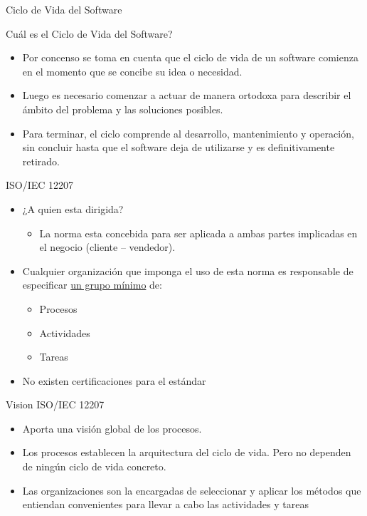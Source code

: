 \documentclass{beamer}
\begin{document}
				\begin{frame}{Ciclo de Vida del Software}
				\begin{center}
					\begin{center}
						{\huge Cu\'al es el Ciclo de Vida del Software?}
					\end{center}
					
					\begin{itemize}
					\pause
						\item Por concenso se toma en cuenta que el ciclo de vida de un software comienza en el momento que se concibe su idea o necesidad.\pause
						\item Luego es necesario comenzar a actuar de manera ortodoxa para describir el ámbito del problema y las soluciones posibles.\pause
						\item Para terminar, el ciclo comprende al desarrollo, mantenimiento y operación, sin concluir hasta que el software deja de utilizarse y es definitivamente retirado.
					\end{itemize}
				\end{center}
			\end{frame}
			
			
			\begin{frame}{ISO/IEC 12207}
				\begin{itemize}
					\item ¿A quien esta dirigida?\pause
					\begin{itemize}
						\item La norma esta concebida para ser aplicada a ambas partes implicadas en el negocio (cliente – vendedor).
					\end{itemize}
					
					\item Cualquier organización que imponga el uso de esta norma es responsable de especificar \underline{un grupo mínimo} de:\pause
				
					\begin{itemize}
						\item Procesos\pause
						\item Actividades\pause
						\item Tareas
					\end{itemize}
					\pause
					\item No existen certificaciones para el estándar
				\end{itemize}
			\end{frame}

			\begin{frame}{Vision ISO/IEC 12207}
				\begin{itemize}
					\item Aporta una visión global de los procesos.\pause
					\item Los procesos establecen la arquitectura del ciclo de vida. Pero no dependen de ningún ciclo de vida concreto.\pause
					\item Las organizaciones son la encargadas de seleccionar y aplicar los métodos que entiendan convenientes para llevar a cabo las actividades y tareas
				\end{itemize}
			\end{frame}
			
\end{document}

